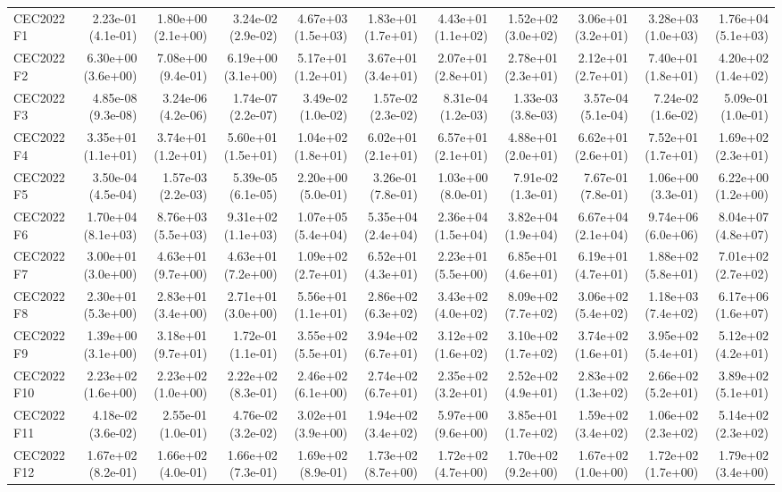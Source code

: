 \begin{longtable}{lrrrrrrrrrr}
CEC2022 F1 & 2.23e-01 (4.1e-01) & 1.80e+00 (2.1e+00) & 3.24e-02 (2.9e-02) & 4.67e+03 (1.5e+03) & 1.83e+01 (1.7e+01) & 4.43e+01 (1.1e+02) & 1.52e+02 (3.0e+02) & 3.06e+01 (3.2e+01) & 3.28e+03 (1.0e+03) & 1.76e+04 (5.1e+03) \\
CEC2022 F2 & 6.30e+00 (3.6e+00) & 7.08e+00 (9.4e-01) & 6.19e+00 (3.1e+00) & 5.17e+01 (1.2e+01) & 3.67e+01 (3.4e+01) & 2.07e+01 (2.8e+01) & 2.78e+01 (2.3e+01) & 2.12e+01 (2.7e+01) & 7.40e+01 (1.8e+01) & 4.20e+02 (1.4e+02) \\
CEC2022 F3 & 4.85e-08 (9.3e-08) & 3.24e-06 (4.2e-06) & 1.74e-07 (2.2e-07) & 3.49e-02 (1.0e-02) & 1.57e-02 (2.3e-02) & 8.31e-04 (1.2e-03) & 1.33e-03 (3.8e-03) & 3.57e-04 (5.1e-04) & 7.24e-02 (1.6e-02) & 5.09e-01 (1.0e-01) \\
CEC2022 F4 & 3.35e+01 (1.1e+01) & 3.74e+01 (1.2e+01) & 5.60e+01 (1.5e+01) & 1.04e+02 (1.8e+01) & 6.02e+01 (2.1e+01) & 6.57e+01 (2.1e+01) & 4.88e+01 (2.0e+01) & 6.62e+01 (2.6e+01) & 7.52e+01 (1.7e+01) & 1.69e+02 (2.3e+01) \\
CEC2022 F5 & 3.50e-04 (4.5e-04) & 1.57e-03 (2.2e-03) & 5.39e-05 (6.1e-05) & 2.20e+00 (5.0e-01) & 3.26e-01 (7.8e-01) & 1.03e+00 (8.0e-01) & 7.91e-02 (1.3e-01) & 7.67e-01 (7.8e-01) & 1.06e+00 (3.3e-01) & 6.22e+00 (1.2e+00) \\
CEC2022 F6 & 1.70e+04 (8.1e+03) & 8.76e+03 (5.5e+03) & 9.31e+02 (1.1e+03) & 1.07e+05 (5.4e+04) & 5.35e+04 (2.4e+04) & 2.36e+04 (1.5e+04) & 3.82e+04 (1.9e+04) & 6.67e+04 (2.1e+04) & 9.74e+06 (6.0e+06) & 8.04e+07 (4.8e+07) \\
CEC2022 F7 & 3.00e+01 (3.0e+00) & 4.63e+01 (9.7e+00) & 4.63e+01 (7.2e+00) & 1.09e+02 (2.7e+01) & 6.52e+01 (4.3e+01) & 2.23e+01 (5.5e+00) & 6.85e+01 (4.6e+01) & 6.19e+01 (4.7e+01) & 1.88e+02 (5.8e+01) & 7.01e+02 (2.7e+02) \\
CEC2022 F8 & 2.30e+01 (5.3e+00) & 2.83e+01 (3.4e+00) & 2.71e+01 (3.0e+00) & 5.56e+01 (1.1e+01) & 2.86e+02 (6.3e+02) & 3.43e+02 (4.0e+02) & 8.09e+02 (7.7e+02) & 3.06e+02 (5.4e+02) & 1.18e+03 (7.4e+02) & 6.17e+06 (1.6e+07) \\
CEC2022 F9 & 1.39e+00 (3.1e+00) & 3.18e+01 (9.7e+01) & 1.72e-01 (1.1e-01) & 3.55e+02 (5.5e+01) & 3.94e+02 (6.7e+01) & 3.12e+02 (1.6e+02) & 3.10e+02 (1.7e+02) & 3.74e+02 (1.6e+01) & 3.95e+02 (5.4e+01) & 5.12e+02 (4.2e+01) \\
CEC2022 F10 & 2.23e+02 (1.6e+00) & 2.23e+02 (1.0e+00) & 2.22e+02 (8.3e-01) & 2.46e+02 (6.1e+00) & 2.74e+02 (6.7e+01) & 2.35e+02 (3.2e+01) & 2.52e+02 (4.9e+01) & 2.83e+02 (1.3e+02) & 2.66e+02 (5.2e+01) & 3.89e+02 (5.1e+01) \\
CEC2022 F11 & 4.18e-02 (3.6e-02) & 2.55e-01 (1.0e-01) & 4.76e-02 (3.2e-02) & 3.02e+01 (3.9e+00) & 1.94e+02 (3.4e+02) & 5.97e+00 (9.6e+00) & 3.85e+01 (1.7e+02) & 1.59e+02 (3.4e+02) & 1.06e+02 (2.3e+02) & 5.14e+02 (2.3e+02) \\
CEC2022 F12 & 1.67e+02 (8.2e-01) & 1.66e+02 (4.0e-01) & 1.66e+02 (7.3e-01) & 1.69e+02 (8.9e-01) & 1.73e+02 (8.7e+00) & 1.72e+02 (4.7e+00) & 1.70e+02 (9.2e+00) & 1.67e+02 (1.0e+00) & 1.72e+02 (1.7e+00) & 1.79e+02 (3.4e+00) \\
\bottomrule
\end{longtable}
